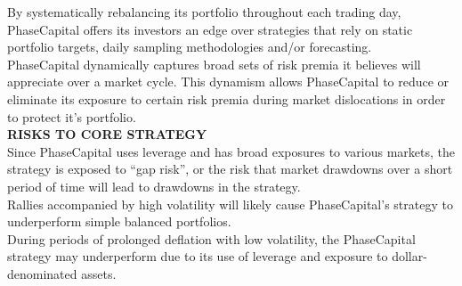 \documentclass[9pt]{article}
\begin{document}
By systematically rebalancing its portfolio throughout each trading day,
PhaseCapital offers its investors an edge over strategies that rely on static
portfolio targets, daily sampling methodologies and/or forecasting. \\

PhaseCapital dynamically captures broad sets of risk premia it believes will
appreciate over a market cycle. This dynamism allows PhaseCapital to reduce
or eliminate its exposure to certain risk premia during market dislocations
in order to protect it's portfolio. \\

\textbf{\textcolor{phaseGold}{RISKS TO CORE STRATEGY}} \\
Since PhaseCapital uses leverage and has broad exposures to various markets,
the strategy is exposed to ``gap risk'', or the risk that market drawdowns over
a short period of time will lead to drawdowns in the strategy. \\

Rallies accompanied by high volatility will likely cause PhaseCapital's strategy
to underperform simple balanced portfolios. \\

During periods of prolonged deflation with low volatility, the PhaseCapital
strategy may underperform due to its use of leverage and exposure to
dollar-denominated assets. \\
\end{document}
